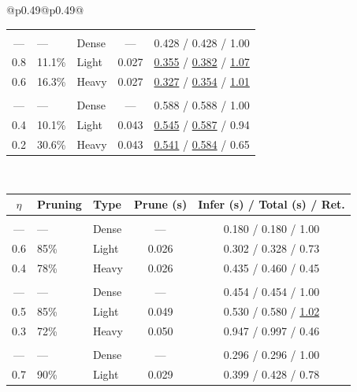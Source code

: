 \begin{table}[!htbp]
\begin{tabular}{@{}p{}@{}p{}@{}}
\begin{tabular}{c l l c c}
\addlinespace[0.5pt]
\rowcolor{lightgray} \multicolumn{5}{c}{\rule{0pt}{2.2ex}\textbf{LLaMA-3.1-8B (CommonsenseQA)}\rule[-0.8ex]{0pt}{0pt}} \\
--- & --- & Dense & --- & 0.428 / 0.428 / 1.00 \\
0.8 & 11.1\% & Light & 0.027 & \underline{0.355} / \underline{0.382} / \underline{1.07} \\
0.6 & 16.3\% & Heavy & 0.027 & \underline{0.327} / \underline{0.354} / \underline{1.01} \\
\addlinespace[0.5pt]
\rowcolor{lightgray} \multicolumn{5}{c}{\rule{0pt}{2.2ex}\textbf{LLaMA-2-13B (CommonsenseQA)}\rule[-0.8ex]{0pt}{0pt}} \\
--- & --- & Dense & --- & 0.588 / 0.588 / 1.00 \\
0.4 & 10.1\% & Light & 0.043 & \underline{0.545} / \underline{0.587} / 0.94 \\
0.2 & 30.6\% & Heavy & 0.043 & \underline{0.541} / \underline{0.584} / 0.65 \\
\bottomrule
\end{tabular} \\[0.5em]
\begin{tabular}{c l l c c}
\toprule
\textbf{$\eta$} & \textbf{Pruning} & \textbf{Type} & \textbf{Prune (s)} & \textbf{Infer (s)} / \textbf{Total (s)} / \textbf{Ret.} \\
\midrule
\rowcolor{lightgray} \multicolumn{5}{c}{\rule{0pt}{2.2ex}\textbf{Qwen2.5-7B (OOD)}\rule[-0.8ex]{0pt}{0pt}} \\
--- & --- & Dense & --- & 0.180 / 0.180 / 1.00 \\
0.6 & 85\% & Light & 0.026 & 0.302 / 0.328 / 0.73 \\
0.4 & 78\% & Heavy & 0.026 & 0.435 / 0.460 / 0.45 \\
\addlinespace[0.5pt]
\rowcolor{lightgray} \multicolumn{5}{c}{\rule{0pt}{2.2ex}\textbf{Qwen2.5-14B (OOD)}\rule[-0.8ex]{0pt}{0pt}} \\
--- & --- & Dense & --- & 0.454 / 0.454 / 1.00 \\
0.5 & 85\% & Light & 0.049 & 0.530 / 0.580 / \underline{1.02} \\
0.3 & 72\% & Heavy & 0.050 & 0.947 / 0.997 / 0.46 \\
\addlinespace[0.5pt]
\rowcolor{lightgray} \multicolumn{5}{c}{\rule{0pt}{2.2ex}\textbf{LLaMA-3.1-8B (OOD)}\rule[-0.8ex]{0pt}{0pt}} \\
--- & --- & Dense & --- & 0.296 / 0.296 / 1.00 \\
0.7 & 90\% & Light & 0.029 & 0.399 / 0.428 / 0.78 \\

\end{tabular}
\end{tabular}
\end{table}
